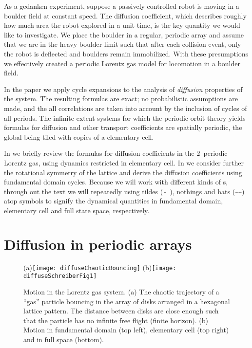 \documentclass[aps,pre,
                showpacs,
                twocolumn,
                groupedaddress,
                floatfix]{revtex4-1}
\begin{document}
As a gedanken experiment, suppose a passively
controlled robot is moving in a boulder field at constant speed. The
diffusion coefficient, which describes roughly how much area the robot
explored in a unit time, is the key quantity we would like to
investigate. We place the boulder in a regular, periodic array and
assume that we are in the heavy boulder limit such that after each
collision event, only the robot is deflected and boulders remain
immobilized. With these presumptions we effectively created a periodic
Lorentz gas model for locomotion in a boulder field.

In the paper we apply cycle expansions to the analysis of {\em
  diffusion} properties of the system. The resulting formulas are
exact; no probabilistic assumptions are made, and the all correlations
are taken into account by the inclusion of cycles of all periods. The
infinite extent systems for which the periodic orbit theory yields
formulas for diffusion and other transport coefficients are spatially
periodic, the global {\statesp} being tiled with copies of a
elementary cell.

In  we briefly review the formulas for diffusion
coefficients in the $2$\dmn\ periodic Lorentz gas, using dynamics
restricted in elementary cell. In we
consider further the rotational symmetry of the lattice and derive the
diffusion coefficients using fundamental domain cycles. Because we
will work with different kinds of \statesp s, through out the text we
will repeatedly using tildes ($\tilde{\quad}$), nothings and hats
($\hat{\quad}$) atop symbols to signify the dynamical quantities in
fundamental domain, elementary cell and full state space,
respectively.

\section{Diffusion in periodic arrays}
\label{s-DiffPerArr}

\begin{figure}[htbp]
  \begin{center}
    (a)\texttt{[image: diffuseChaoticBouncing]}
    (b)\texttt{[image: diffuseSchreiberFig1]}
  \end{center}
  \caption[]{\label{fig-chaoticBouncing} Motion in the Lorentz gas
    system. (a) The chaotic trajectory of a ``gas'' particle bouncing
    in the array of disks arranged in a hexagonal lattice pattern. The
    distance between disks are close enough such that the particle has
    no infinite free flight (finite horizon). (b) Motion in
    fundamental domain (top left), elementary cell (top right) and in
    full space (bottom). }
\end{figure}
\end{document}
